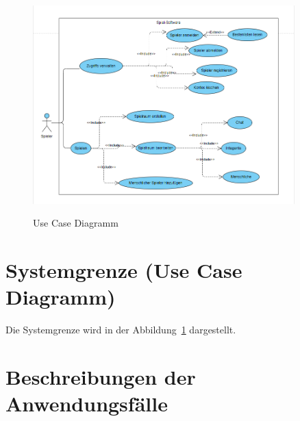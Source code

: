 \begin{figure}
\centering	
\includegraphics[width=0.9\textwidth]{img/group6.png}
\label{fig:sys}
\caption{Use Case Diagramm}
\end{figure}

\section{Systemgrenze (Use Case Diagramm)}

Die Systemgrenze wird in der Abbildung~\ref{fig:sys} dargestellt. 


\section{Beschreibungen der Anwendungsfälle}


\setcounter{uc}{10}

